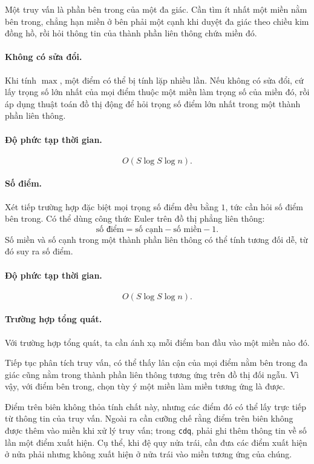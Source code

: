 \documentclass[11pt]{article}
\begin{document}
Một truy vấn là phần bên trong của một đa giác. Cần tìm ít nhất một miền nằm bên
trong, chẳng hạn miền ở bên phải một cạnh khi duyệt đa giác theo chiều kim đồng
hồ, rồi hỏi thông tin của thành phần liên thông chứa miền đó.

\paragraph{Không có sửa đổi.}
Khi tính \(\max\), một điểm có thể bị tính lặp nhiều lần. Nếu không có sửa đổi,
cứ lấy trọng số lớn nhất của mọi điểm thuộc một miền làm trọng số của miền đó,
rồi áp dụng thuật toán đồ thị động để hỏi trọng số điểm lớn nhất trong một thành
phần liên thông.

\paragraph{Độ phức tạp thời gian.}
\[
  O(S\log S\log n).
\]

\paragraph{Số điểm.}
Xét tiếp trường hợp đặc biệt mọi trọng số điểm đều bằng \(1\), tức cần hỏi số
điểm bên trong. Có thể dùng công thức Euler trên đồ thị phẳng liên thông:
\[
  \text{số điểm}=\text{số cạnh}-\text{số miền}-1.
\]
Số miền và số cạnh trong một thành phần liên thông có thể tính tương đối dễ, từ
đó suy ra số điểm.

\paragraph{Độ phức tạp thời gian.}
\[
  O(S\log S\log n).
\]

\paragraph{Trường hợp tổng quát.}
Với trường hợp tổng quát, ta cần ánh xạ mỗi điểm ban đầu vào một miền nào đó.

Tiếp tục phân tích truy vấn, có thể thấy lân cận của mọi điểm nằm bên trong đa
giác cũng nằm trong thành phần liên thông tương ứng trên đồ thị đối ngẫu. Vì
vậy, với điểm bên trong, chọn tùy ý một miền làm miền tương ứng là được.

Điểm trên biên không thỏa tính chất này, nhưng các điểm đó có thể lấy trực tiếp
từ thông tin của truy vấn. Ngoài ra cần cưỡng chế rằng điểm trên biên không
được thêm vào miền khi xử lý truy vấn; trong \texttt{cdq}, phải ghi thêm thông
tin về số lần một điểm xuất hiện. Cụ thể, khi đệ quy nửa trái, cần đưa các điểm
xuất hiện ở nửa phải nhưng không xuất hiện ở nửa trái vào miền tương ứng của
chúng.
\end{document}

